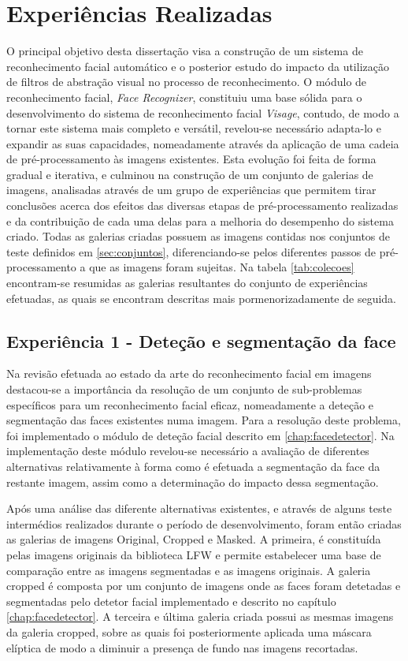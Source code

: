\section{Experiências Realizadas} \label{sec:experiencias}
O principal objetivo desta dissertação visa a construção de um sistema de reconhecimento facial automático e o posterior estudo do impacto da utilização de filtros de abstração visual no processo de reconhecimento. O módulo de reconhecimento facial, \textit{Face Recognizer}, constituiu uma base sólida para o desenvolvimento do sistema de reconhecimento facial \textit{Visage}, contudo, de modo a tornar este sistema mais completo e versátil, revelou-se necessário adapta-lo e expandir as suas capacidades, nomeadamente através da aplicação de uma cadeia de pré-processamento às imagens existentes. Esta evolução foi feita de forma gradual e iterativa, e culminou na construção de um conjunto de galerias de imagens, analisadas através de um grupo de experiências que permitem tirar conclusões acerca dos efeitos das diversas etapas de pré-processamento realizadas e da contribuição de cada uma delas para a melhoria do desempenho do sistema criado. Todas as galerias criadas possuem as imagens contidas nos conjuntos de teste definidos em \ref{sec:conjuntos}, diferenciando-se pelos diferentes passos de pré-processamento a que as imagens foram sujeitas. Na tabela \ref{tab:colecoes} encontram-se resumidas as galerias resultantes do conjunto de experiências efetuadas, as quais se encontram descritas mais pormenorizadamente de seguida.

\subsection{Experiência 1 - Deteção e segmentação da face}
Na revisão efetuada ao estado da arte do reconhecimento facial em imagens destacou-se a importância da resolução de um conjunto de sub-problemas específicos para um reconhecimento facial eficaz, nomeadamente a deteção e segmentação das faces existentes numa imagem. Para a resolução deste problema, foi implementado o módulo de deteção facial descrito em \ref{chap:facedetector}. Na implementação deste módulo revelou-se necessário a avaliação de diferentes alternativas relativamente à forma como é efetuada a segmentação da face da restante imagem, assim como a determinação do impacto dessa segmentação. 

Após uma análise das diferente alternativas existentes, e através de alguns teste intermédios realizados durante o período de desenvolvimento, foram então criadas as galerias de imagens Original, Cropped e Masked. A primeira, é constituída pelas imagens originais da biblioteca LFW e permite estabelecer uma base de comparação entre as imagens segmentadas e as imagens originais. A galeria cropped é composta por um conjunto de imagens onde as faces foram detetadas e segmentadas pelo detetor facial implementado e descrito no capítulo \ref{chap:facedetector}. A terceira e última galeria criada possui as mesmas imagens da galeria cropped, sobre as quais foi posteriormente aplicada uma máscara elíptica de modo a diminuir a presença de fundo nas imagens recortadas.


